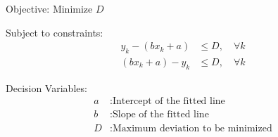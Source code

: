 \documentclass{article}
\begin{document}
Objective: Minimize \( D \)

Subject to constraints:
\begin{align*}
y_k - (bx_k + a) &\leq D, \quad \forall k \\
(bx_k + a) - y_k &\leq D, \quad \forall k
\end{align*}

Decision Variables:
\begin{align*}
a & : \text{Intercept of the fitted line} \\
b & : \text{Slope of the fitted line} \\
D & : \text{Maximum deviation to be minimized}
\end{align*}
\end{document}
